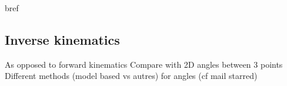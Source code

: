bref


\subsection{Inverse kinematics}

As opposed to forward kinematics \newline
Compare with 2D angles between 3 points \newline
Different methods (model based vs autres) for angles (cf mail starred)\newline












